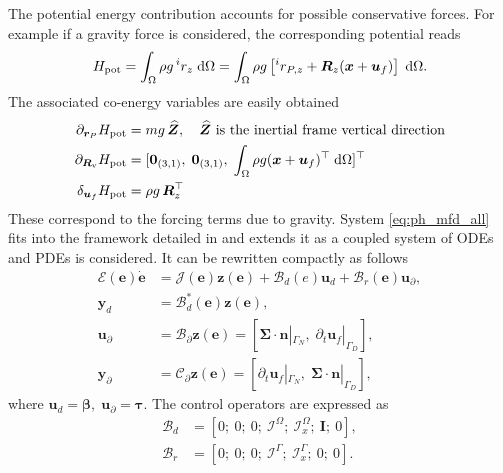 \documentclass{svjour3}                     %
\begin{document}
The potential energy contribution accounts for possible conservative forces. For example if a gravity force is considered, the corresponding potential reads
\begin{equation*}
H_{\text{pot}} = \int_{\Omega} \rho g \, ^i r_z \d{\Omega} = \int_{\Omega} \rho g \left[ ^i r_{P, z} +\bm{R}_z (\bm{x} + \bm{u}_f) \right] \d{\Omega}.
\end{equation*}
The associated co-energy variables are easily obtained
\begin{align*}
\partial_{\bm{r}_P}H_{\text{pot}} &= m g \, \widehat{\bm{Z}}, \quad \text{$\widehat{\bm{Z}}$ is the inertial frame vertical direction}\\
\partial_{\bm{R}_\text{v}}H_{\text{pot}} &= [\bm{0}_{(3, 1)}, \; \bm{0}_{(3, 1)}, \; \int_{\Omega} \rho g (\bm{x} + \bm{u}_f)^\top \d{\Omega}]^\top \\
\delta_{\bm{u}_f} H_{\text{pot}} &= \rho g \, \bm{R}_z^\top
\end{align*}
These correspond to the forcing terms due to gravity.
System \eqref{eq:ph_mfd_all} fits into the framework detailed in \cite{mehrmann2019structurepreserving} and extends it as a coupled system of ODEs and PDEs is considered. It can be rewritten compactly as follows
\begin{equation}
\label{eq:MFD_pHDAE}
\begin{aligned}
\bm{\mathcal{E}}(\bm{e}) \dot{\bm{e}} &= \bm{\mathcal{J}}(\bm{e}) \bm{z}(\bm{e}) + \bm{\mathcal{B}}_d(e) \bm{u}_d + \bm{\mathcal{B}}_r(\bm{e}) \bm{u}_\partial, \\
\bm{y}_d &= \bm{\mathcal{B}}_d^*(\bm{e}) \bm{z}(\bm{e}), \\
\bm{u}_\partial &= \bm{\mathcal{B}}_{\partial} \bm{z}(\bm{e}) =  [\bm\Sigma \cdot \bm{n}|_{\Gamma_N}, \; \partial_t \bm{u}_f|_{\Gamma_D}], \\
\bm{y}_\partial &= \bm{\mathcal{C}}_{\partial} \bm{z}(\bm{e}) = [\partial_t \bm{u}_f|_{\Gamma_N}, \; \bm\Sigma \cdot \bm{n}|_{\Gamma_D}],
\end{aligned}
\end{equation}
where $\bm{u}_d = \bm\beta, \; \bm{u}_\partial = \bm\tau$. The control operators are expressed as
\begin{align*}
	\bm{\mathcal{B}}_d &= [0; \ 0; \ 0; \ \mathcal{I}^\Omega; \ \bm{\mathcal{I}}_{x}^\Omega; \ \bm{I}; \ 0], \\
	 \bm{\mathcal{B}}_r &= [0; \ 0; \ 0; \ \mathcal{I}^\Gamma; \ \bm{\mathcal{I}}_{x}^\Gamma; \ 0; \ 0].
\end{align*}
\end{document}
